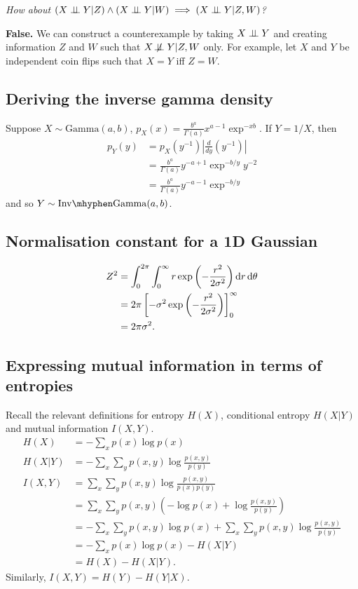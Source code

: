 \textit{How about $(X \indep Y | Z) \land (X \indep Y | W) \implies (X \indep Y | Z, W)$?}

\textbf{False.} We can construct a counterexample by taking $X \perp\!\!\!\perp Y$ and creating information $Z$ and $W$ such that $X \not\!\perp\!\!\!\perp Y | Z, W$ only. For example, let $X$ and $Y$ be independent coin flips such that $X = Y$ iff $Z = W$.

\subsection{Deriving the inverse gamma density}
Suppose $X \sim \mathrm{Gamma}(a,b)$, $p_X(x) = \frac{b^a}{\Gamma(a)} x^{a-1} \exp^{-xb}$. If $Y=1/X$, then
\begin{align*}
p_Y(y) &= p_X(y^{-1})\left|\frac{d}{dy}(y^{-1})\right|\\
&= \frac{b^a}{\Gamma(a)} y^{-a+1} \exp^{-b/y} y^{-2}\\
&= \frac{b^a}{\Gamma(a)} y^{-a-1} \exp^{-b/y}
\end{align*}
and so $Y \sim \mathrm{Inv \mhyphen Gamma}(a,b)$.

\subsection{Normalisation constant for a 1D Gaussian}
\begin{align*}
Z^2 &= \int_{0}^{2\pi} \int_{0}^{\infty} r \exp\left(-\frac{r^2}{2\sigma^2}\right) \mathop{}\!\mathrm{d}{r} \mathop{}\!\mathrm{d}{\theta}\\
&= 2\pi \left[-\sigma^2 \exp\left(-\frac{r^2}{2\sigma^2}\right) \right]_{0}^{\infty}\\
&= 2\pi\sigma^2.
\end{align*}

\subsection{Expressing mutual information in terms of entropies}
Recall the relevant definitions for entropy $H(X)$, conditional entropy $H(X|Y)$ and mutual information $I(X,Y)$.
\begin{align*}
H(X) &= -\sum_x p(x) \log p(x)\\
H(X|Y) &= -\sum_x \sum_y p(x,y) \log\frac{p(x,y)}{p(y)}\\
I(X,Y) &= \sum_x \sum_y p(x,y) \log\frac{p(x,y)}{p(x)p(y)}\\
&= \sum_x \sum_y p(x,y) \left( -\log{p(x)} + \log\frac{p(x,y)}{p(y)} \right)\\
&= -\sum_x \sum_y p(x,y)\log{p(x)} + \sum_x \sum_y p(x,y) \log\frac{p(x,y)}{p(y)}\\
&= -\sum_x p(x)\log{p(x)} - H(X|Y)\\
&= H(X) - H(X|Y).
\end{align*}
Similarly, $I(X,Y) = H(Y) - H(Y|X)$.

